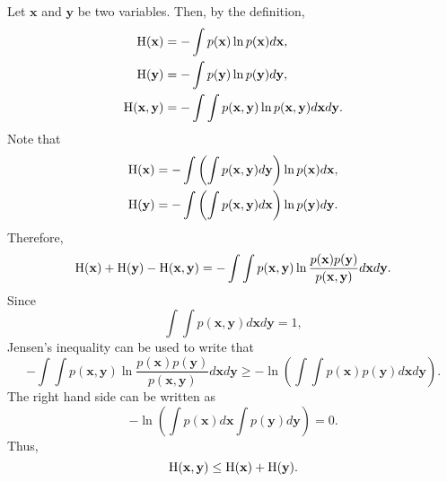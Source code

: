 \subsection{}
Let $\mathbf{x}$ and $\mathbf{y}$ be two variables.
Then, by the definition, 
%
\begin{equation}
\begin{aligned}
{\rm H}(\mathbf{x}) &= - \int p(\mathbf{x}) \ln p(\mathbf{x}) d\mathbf{x}, \\
{\rm H}(\mathbf{y}) &= - \int p(\mathbf{y}) \ln p(\mathbf{y}) d\mathbf{y}, \\
{\rm H}(\mathbf{x}, \mathbf{y}) &= - \int \int p(\mathbf{x}, \mathbf{y}) \ln p(\mathbf{x}, \mathbf{y}) d\mathbf{x} d\mathbf{y}.
\end{aligned}
\end{equation}
%
Note that
%
\begin{equation}
\begin{aligned}
{\rm H}(\mathbf{x}) &= - \int \left( \int p(\mathbf{x}, \mathbf{y}) d\mathbf{y} \right) \ln p(\mathbf{x}) d\mathbf{x}, \\
{\rm H}(\mathbf{y}) &= - \int \left( \int p(\mathbf{x}, \mathbf{y}) d\mathbf{x} \right) \ln p(\mathbf{y}) d\mathbf{y}.
\end{aligned}
\end{equation}
%
Therefore,
%
\begin{equation}
{\rm H}(\mathbf{x}) + {\rm H}(\mathbf{y}) - {\rm H}(\mathbf{x}, \mathbf{y}) = - \int \int p(\mathbf{x}, \mathbf{y}) \ln \frac{p(\mathbf{x}) p(\mathbf{y})}{p(\mathbf{x}, \mathbf{y})} d\mathbf{x} d\mathbf{y}.
\end{equation}
%
Since
%
\begin{equation}
\int \int p(\mathbf{x}, \mathbf{y}) d\mathbf{x} d\mathbf{y} = 1,
\end{equation}
%
Jensen's inequality can be used to write that
%
\begin{equation}
- \int \int p(\mathbf{x}, \mathbf{y}) \ln \frac{p(\mathbf{x}) p(\mathbf{y})}{p(\mathbf{x}, \mathbf{y})} d\mathbf{x} d\mathbf{y} \geq - \ln \left( \int \int p(\mathbf{x}) p(\mathbf{y}) d\mathbf{x} d\mathbf{y} \right).
\end{equation}
%
The right hand side can be written as
%
\begin{equation}
- \ln \left( \int p(\mathbf{x}) d\mathbf{x} \int  p(\mathbf{y}) d\mathbf{y} \right) = 0.
\end{equation}
%
Thus,
%
\begin{equation}
{\rm H}(\mathbf{x}, \mathbf{y}) \leq {\rm H}(\mathbf{x}) + {\rm H}(\mathbf{y}).
\end{equation}
%


